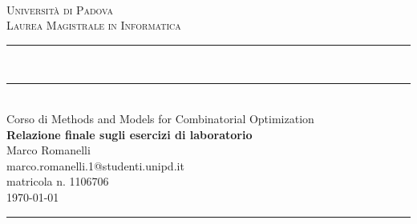 \documentclass[fleqn,a4paper,11pt]{article}
\newcommand\HRule{\rule{\textwidth}{1pt}}
\newcommand\DRule{\rule{\textwidth}{.4pt}\\[\dimexpr-\baselineskip+1mm+2pt] \rule{\textwidth}{2pt}}
\begin{document}
\begin{titlepage}
\begin{center}
	\begin{minipage}{6in}
  		\centering
  		\hspace*{1.6in}
	\end{minipage}\\[1cm]
\textsc{\LARGE Universit\`a di Padova}\\[.2cm]
\textsc{\large Laurea Magistrale in Informatica}\\[.3cm]
\DRule \\[.5cm]
{\large Corso di Methods and Models for Combinatorial Optimization} \\[.4cm]
{\huge \bfseries Relazione finale sugli esercizi di laboratorio} \\[.4cm]
{\Large Marco Romanelli} \\[.2cm]
{\footnotesize marco.romanelli.1@studenti.unipd.it} \\
{\footnotesize matricola n. 1106706} \\[1cm]
{\large \today}
\HRule \\[3cm]
\end{center}
\end{titlepage}





\end{document}
